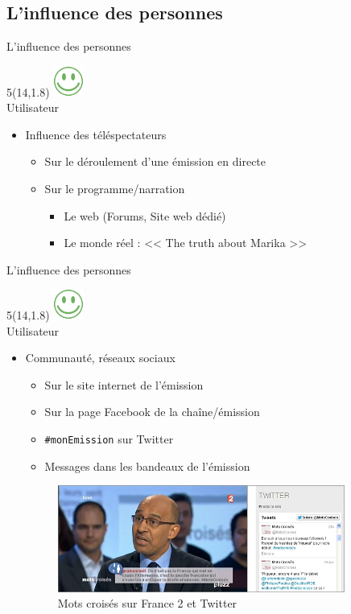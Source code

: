 \documentclass{beamer}
\newcommand{\happyUser}{%
			\begin{textblock}{5}(14,1.8)
				\includegraphics[width=1.0cm]{user_happy.png}\\
				\tiny Utilisateur
			\end{textblock}
}
\begin{document}
	\subsection{L'influence des personnes}
	\begin{frame}{L'influence des personnes}
		\happyUser{}
\begin{itemize}
	\item Influence des téléspectateurs
		\begin{itemize}
			\item Sur le déroulement d'une émission en directe
			\item Sur le programme/narration
				\begin{itemize}
					\item Le web (Forums, Site web dédié)
					\item Le monde réel : << The truth about Marika >>
				\end{itemize}
		\end{itemize}
\end{itemize}
	\end{frame}
	\begin{frame}{L'influence des personnes}
		\happyUser{}
		\begin{itemize}
	\item Communauté, réseaux sociaux
		\begin{itemize}
			\item Sur le site internet de l'émission
			\item Sur la page Facebook de la chaîne/émission
			\item \texttt{\#monEmission} sur Twitter
			\item Messages dans les bandeaux de l'émission
		\end{itemize}
		\begin{figure}[H]
			\hspace{-25px}
			\includegraphics[height=3.5cm]{images/motscroises.jpg}
			\caption{Mots croisés sur France 2 et Twitter}
		\end{figure}
\end{itemize}
	\end{frame}
\end{document}
